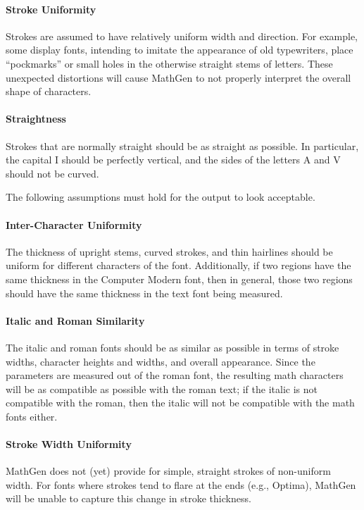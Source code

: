 \paragraph{Stroke Uniformity} Strokes are assumed to have relatively uniform
width and direction. For example, some display fonts, intending to imitate the
appearance of old typewriters, place ``pockmarks'' or small holes in the
otherwise straight stems of letters. These unexpected distortions will cause
MathGen to not properly interpret the overall shape of characters.

\paragraph{Straightness} Strokes that are normally straight should be as
straight as possible. In particular, the capital I should be perfectly vertical,
and the sides of the letters A and V should not be curved.

\linespace

The following assumptions must hold for the output to look acceptable.

\paragraph{Inter-Character Uniformity} The thickness of upright stems, curved
strokes, and thin hairlines should be uniform for different characters of the
font. Additionally, if two regions have the same thickness in the Computer
Modern font, then in general, those two regions should have the same thickness
in the text font being measured.

\paragraph{Italic and Roman Similarity} The italic and roman fonts should be as
similar as possible in terms of stroke widths, character heights and widths, and
overall appearance. Since the parameters are measured out of the roman font, the
resulting math characters will be as compatible as possible with the roman text;
if the italic is not compatible with the roman, then the italic will not be
compatible with the math fonts either.

\paragraph{Stroke Width Uniformity} MathGen does not (yet) provide for simple,
straight strokes of non-uniform width. For fonts where strokes tend to flare at
the ends (e.g., Optima), MathGen will be unable to capture this change in stroke
thickness.

